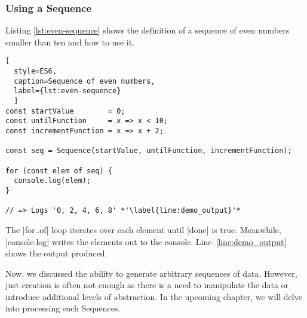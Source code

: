 \subsubsection{Using a Sequence}
\label{subsub:Using a Sequence}
Listing \ref{lst:even-sequence} shows the definition of a sequence of even 
numbers smaller than ten and how to use it. 
\begin{lstlisting}[
  style=ES6, 
  caption=Sequence of even numbers,
  label={lst:even-sequence}
  ]
const startValue        = 0;
const untilFunction     = x => x < 10;
const incrementFunction = x => x + 2;

const seq = Sequence(startValue, untilFunction, incrementFunction);

for (const elem of seq) {
  console.log(elem);
}

// => Logs '0, 2, 4, 6, 8' *'\label{line:demo_output}'*
\end{lstlisting}

The |for..of| loop iterates over each
element until |done| is true. Meanwhile, |console.log| writes the elements out 
to the console. Line~\ref{line:demo_output} shows the output produced.
\newline

Now, we discussed the ability to generate arbitrary sequences of data. However, 
just creation is often not enough as there is a need to manipulate the data or 
introduce additional levels of abstraction. In the upcoming chapter, we will 
delve into processing such Sequences.
